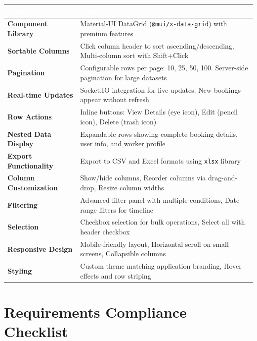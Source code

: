 \documentclass[12pt,a4paper]{article}
\begin{document}
\begin{table}[H]
\centering
\renewcommand{\arraystretch}{1.6}
\begin{tabularx}{\textwidth}{|p{4cm}|X|}
\hline
\rowcolor{headerblue}
\textcolor{white}{\textbf{Feature}} & \textcolor{white}{\textbf{Implementation}} \\
\hline
\rowcolor{lightgray}
\textbf{Component Library} & Material-UI DataGrid (\texttt{@mui/x-data-grid}) with premium features \\
\hline
\textbf{Sortable Columns} & Click column header to sort ascending/descending, Multi-column sort with Shift+Click \\
\hline
\rowcolor{lightgray}
\textbf{Pagination} & Configurable rows per page: 10, 25, 50, 100. Server-side pagination for large datasets \\
\hline
\textbf{Real-time Updates} & Socket.IO integration for live updates. New bookings appear without refresh \\
\hline
\rowcolor{lightgray}
\textbf{Row Actions} & Inline buttons: View Details (eye icon), Edit (pencil icon), Delete (trash icon) \\
\hline
\textbf{Nested Data Display} & Expandable rows showing complete booking details, user info, and worker profile \\
\hline
\rowcolor{lightgray}
\textbf{Export Functionality} & Export to CSV and Excel formats using \texttt{xlsx} library \\
\hline
\textbf{Column Customization} & Show/hide columns, Reorder columns via drag-and-drop, Resize column widths \\
\hline
\rowcolor{lightgray}
\textbf{Filtering} & Advanced filter panel with multiple conditions, Date range filters for timeline \\
\hline
\textbf{Selection} & Checkbox selection for bulk operations, Select all with header checkbox \\
\hline
\rowcolor{lightgray}
\textbf{Responsive Design} & Mobile-friendly layout, Horizontal scroll on small screens, Collapsible columns \\
\hline
\textbf{Styling} & Custom theme matching application branding, Hover effects and row striping \\
\hline
\end{tabularx}
\end{table}

\newpage
\section*{Requirements Compliance Checklist}
\end{document}
